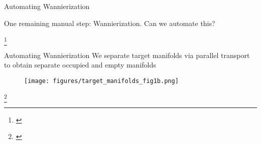 \documentclass[xcolor=table,aspectratio=169]{beamer}
\newcommand\blfootcite[1]{%
  \begingroup
  \renewcommand\thefootnote{}\footnote{\hspace{-4ex}\cite{#1}}%
  \addtocounter{footnote}{-1}%
  \endgroup
}
\numberwithin{equation}{section}
\begin{document}
\begin{frame}{Automating Wannierization}

   One remaining manual step: Wannierization. Can we automate this?

   \begin{figure}[t]
      \begin{subfigure}{0.225\textwidth}
      \end{subfigure}
      \begin{subfigure}{0.225\textwidth}
      \end{subfigure}
      \hspace{0.025\textwidth}
      \begin{subfigure}{0.225\textwidth}
      \end{subfigure}
   \end{figure}


   \blfootcite{Qiao2023}

\end{frame}

\begin{frame}{Automating Wannierization}
   We separate target manifolds via parallel transport to obtain separate occupied and empty manifolds

      \begin{figure}
         \texttt{[image: figures/target\_manifolds\_fig1b.png]}
      \end{figure}


   \blfootcite{Qiao2023a}

\end{frame}
\end{document}
